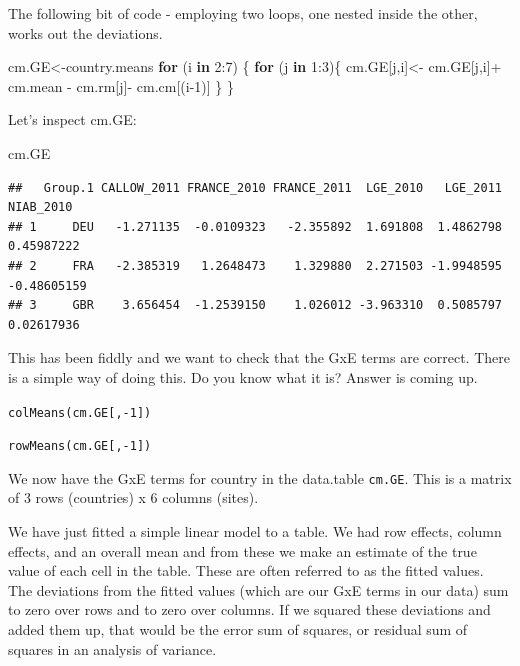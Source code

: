 \documentclass[
]{book}
\newenvironment{Shaded}{\begin{snugshade}}{\end{snugshade}}
\newcommand{\ControlFlowTok}[1]{\textcolor[rgb]{0.13,0.29,0.53}{\textbf{#1}}}
\newcommand{\DecValTok}[1]{\textcolor[rgb]{0.00,0.00,0.81}{#1}}
\newcommand{\NormalTok}[1]{#1}
\newcommand{\OtherTok}[1]{\textcolor[rgb]{0.56,0.35,0.01}{#1}}
\newcommand{\SpecialCharTok}[1]{\textcolor[rgb]{0.00,0.00,0.00}{#1}}
\begin{document}
The following bit of code - employing two loops, one nested inside the other, works out the deviations.

\begin{Shaded}
\begin{Highlighting}[]
\NormalTok{cm.GE}\OtherTok{\textless{}{-}}\NormalTok{country.means}
 \ControlFlowTok{for}\NormalTok{ (i }\ControlFlowTok{in} \DecValTok{2}\SpecialCharTok{:}\DecValTok{7}\NormalTok{) \{}
   \ControlFlowTok{for}\NormalTok{ (j }\ControlFlowTok{in} \DecValTok{1}\SpecialCharTok{:}\DecValTok{3}\NormalTok{)\{ }
\NormalTok{     cm.GE[j,i]}\OtherTok{\textless{}{-}}
\NormalTok{     cm.GE[j,i]}\SpecialCharTok{+}\NormalTok{ cm.mean }\SpecialCharTok{{-}}\NormalTok{ cm.rm[j]}\SpecialCharTok{{-}}\NormalTok{ cm.cm[(i}\DecValTok{{-}1}\NormalTok{)]}
\NormalTok{     \}}
\NormalTok{ \}}
\end{Highlighting}
\end{Shaded}

Let's inspect cm.GE:

\begin{Shaded}
\begin{Highlighting}[]
\NormalTok{cm.GE}
\end{Highlighting}
\end{Shaded}

\begin{verbatim}
##   Group.1 CALLOW_2011 FRANCE_2010 FRANCE_2011  LGE_2010   LGE_2011   NIAB_2010
## 1     DEU   -1.271135  -0.0109323   -2.355892  1.691808  1.4862798  0.45987222
## 2     FRA   -2.385319   1.2648473    1.329880  2.271503 -1.9948595 -0.48605159
## 3     GBR    3.656454  -1.2539150    1.026012 -3.963310  0.5085797  0.02617936
\end{verbatim}

This has been fiddly and we want to check that the GxE terms are correct. There is a simple way of doing this. Do you know what it is? Answer is coming up.

\texttt{colMeans(cm.GE{[},-1{]})}

\texttt{rowMeans(cm.GE{[},-1{]})}

We now have the GxE terms for country in the data.table \texttt{cm.GE}. This is a matrix of 3 rows (countries) x 6 columns (sites).

We have just fitted a simple linear model to a table. We had row effects, column effects, and an overall mean and from these we make an estimate of the true value of each cell in the table. These are often referred to as the fitted values. The deviations from the fitted values (which are our GxE terms in our data) sum to zero over rows and to zero over columns. If we squared these deviations and added them up, that would be the error sum of squares, or residual sum of squares in an analysis of variance.
\end{document}
